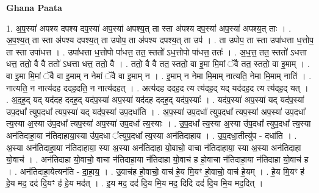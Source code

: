 \documentclass[17pt]{extarticle}
\begin{document}
\textbf{Ghana Paata } \newline

1. अ॒प॒स्या॑ अपश्य दपश्य दप॒स्या॑ अप॒स्या॑ अपश्य॒त् ता स्ता अ॑पश्य दप॒स्या॑ अप॒स्या॑ अपश्य॒त् ताः । . अ॒प॒श्य॒त् ता स्ता अ॑पश्य दपश्य॒त् ता उपोप॒ ता अ॑पश्य दपश्य॒त् ता उप॑ । . ता उपोप॒ ता स्ता उपा॑धत्ता ध॒त्तोप॒ ता स्ता उपा॑धत्त । . उपा॑धत्ता ध॒त्तोपो पा॑धत्त॒ तत॒ स्ततो॑ ऽध॒त्तोपो पा॑धत्त॒ ततः॑ । . अ॒ध॒त्त॒ तत॒ स्ततो॑ ऽधत्ता धत्त॒ ततो॒ वै वै ततो॑ ऽधत्ता धत्त॒ ततो॒ वै । . ततो॒ वै वै तत॒ स्ततो॒ वा इ॒मा मि॒मां ॅवै तत॒ स्ततो॒ वा इ॒माम् । . वा इ॒मा मि॒मां ॅवै वा इ॒माम् न नेमां ॅवै वा इ॒माम् न । . इ॒माम् न नेमा मि॒माम् नात्यति॒ नेमा मि॒माम् नाति॑ । . नात्यति॒ न नात्य॑दह ददह॒दति॒ न नात्य॑दहत् । . अत्य॑दह ददह॒द त्य त्य॑दह॒द् यद् यद॑दह॒द त्य त्य॑दह॒द् यत् । . अ॒द॒ह॒द् यद् यद॑दह ददह॒द् यद॑प॒स्या॑ अप॒स्या॑ यद॑दह ददह॒द् यद॑प॒स्याः᳚ । . यद॑प॒स्या॑ अप॒स्या॑ यद् यद॑प॒स्या॑ उप॒दधा᳚ त्युप॒दधा᳚ त्यप॒स्या॑ यद् यद॑प॒स्या॑ उप॒दधा॑ति । . अ॒प॒स्या॑ उप॒दधा᳚ त्युप॒दधा᳚ त्यप॒स्या॑ अप॒स्या॑ उप॒दधा᳚ त्य॒स्या अ॒स्या उ॑प॒दधा᳚ त्यप॒स्या॑ अप॒स्या॑ उप॒दधा᳚ त्य॒स्याः । . उ॒प॒दधा᳚ त्य॒स्या अ॒स्या उ॑प॒दधा᳚ त्युप॒दधा᳚ त्य॒स्या अन॑तिदाहा॒या न॑तिदाहाया॒स्या उ॑प॒दधा ᳚त्युप॒दधा᳚ त्य॒स्या अन॑तिदाहाय । . उ॒प॒दधा॒तीत्यु॑प - दधा॑ति । . अ॒स्या अन॑तिदाहा॒या न॑तिदाहाया॒ स्या अ॒स्या अन॑तिदाहा यो॒वाचो॒ वाचा न॑तिदाहाया॒ स्या अ॒स्या अन॑तिदाहा यो॒वाच॑ । . अन॑तिदाहा यो॒वाचो॒ वाचा न॑तिदाहा॒या न॑तिदाहा यो॒वाच॑ ह हो॒वाचा न॑तिदाहा॒या न॑तिदाहा यो॒वाच॑ ह । . अन॑तिदाहा॒येत्यन॑ति - दा॒हा॒य॒ । . उ॒वाच॑ह हो॒वाचो॒ वाच॑ हे॒य मि॒यꣳ हो॒वाचो॒ वाच॑ हे॒यम् । . हे॒य मि॒यꣳ ह॑ हे॒य मद॒ दद॑ दि॒यꣳ ह॑ हे॒य मद॑त् । . इ॒य मद॒ दद॑ दि॒य मि॒य मद॒ दिदि दद॑ दि॒य मि॒य मद॒दित् । \newline
\end{document}
